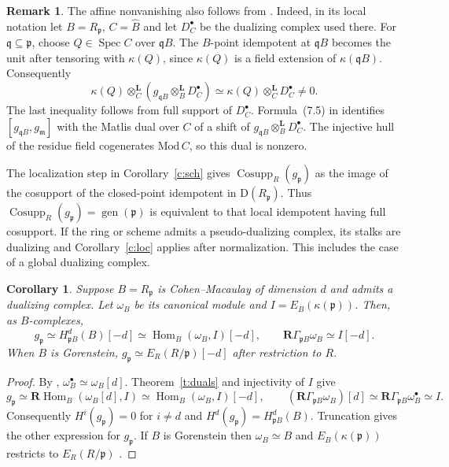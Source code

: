 \documentclass[11pt,reqno]{amsart}
\newtheorem{corollary}[theorem]{Corollary}
\theoremstyle{definition}
\newtheorem{remark}[theorem]{Remark}
\DeclareMathOperator{\Cosupp}{Cosupp}
\DeclareMathOperator{\gen}{gen}
\DeclareMathOperator{\Spec}{Spec}
\DeclareMathOperator{\Hom}{Hom}
\newcommand{\D}{\mathrm D}
\newcommand{\p}{\mathfrak p}
\newcommand{\q}{\mathfrak q}
\newcommand{\m}{\mathfrak m}
\newcommand{\RHom}{\mathbf R\!\operatorname{Hom}}
\newcommand{\RG}{\mathbf R\Gamma}
\newcommand{\dt}{\otimes^{\mathbf L}}
\newcommand{\kpp}{\kappa(\p)}
\numberwithin{equation}{section}
\begin{document}
\begin{remark}
The affine nonvanishing also follows from \cite[Proposition~6.9, equation~(7.5)]{hns}. Indeed, in its local notation let $B=R_{\p}$, $C=\widehat B$ and let $D_C^\bullet$ be the dualizing complex used there. For $\q\subseteq\p$, choose $Q\in\Spec C$ over $\q B$. The $B$-point idempotent at $\q B$ becomes the unit after tensoring with $\kappa(Q)$, since $\kappa(Q)$ is a field extension of $\kappa(\q B)$. Consequently
\[
 \kappa(Q)\dt_C(g_{\q B}\dt_B D_C^\bullet)
 \simeq\kappa(Q)\dt_C D_C^\bullet\ne0 .
\]
The last inequality follows from full support of $D_C^\bullet$. Formula~(7.5) in \cite{hns} identifies $[g_{\q B},g_{\m}]$ with the Matlis dual over $C$ of a shift of $g_{\q B}\dt_B D_C^\bullet$. The injective hull of the residue field cogenerates $\mathrm{Mod}\,C$, so this dual is nonzero.

The localization step in Corollary~\ref{c:sch} gives $\Cosupp_R(g_{\p})$ as the image of the cosupport of the closed-point idempotent in $\D(R_{\p})$. Thus $\Cosupp_R(g_{\p})=\gen(\p)$ is equivalent to that local idempotent having full cosupport. If the ring or scheme admits a pseudo-dualizing complex, its stalks are dualizing and Corollary~\ref{c:loc} applies after normalization. This includes the case of a global dualizing complex.
\end{remark}

\begin{corollary}\label{c:cm}
Suppose $B=R_{\p}$ is Cohen--Macaulay of dimension $d$ and admits a dualizing complex. Let $\omega_B$ be its canonical module and $I=E_B(\kpp)$. Then, as $B$-complexes,
\[
 g_{\p}\simeq H^d_{\p B}(B)[-d]\simeq\Hom_B(\omega_B,I)[-d],
 \qquad \RG_{\p B}\omega_B\simeq I[-d].
\]
When $B$ is Gorenstein, $g_{\p}\simeq E_R(R/\p)[-d]$ after restriction to $R$.
\end{corollary}
\begin{proof}
By \cite[Tag 0AWS]{stacks}, $\omega_B^\bullet\simeq\omega_B[d]$. Theorem~\ref{t:duals} and injectivity of $I$ give
\[
 g_{\p}\simeq\RHom_B(\omega_B[d],I)
 \simeq\Hom_B(\omega_B,I)[-d],\qquad
 (\RG_{\p B}\omega_B)[d]\simeq\RG_{\p B}\omega_B^\bullet\simeq I .
\]
Consequently $H^i(g_{\p})=0$ for $i\ne d$ and $H^d(g_{\p})=H^d_{\p B}(B)$. Truncation gives the other expression for $g_{\p}$. If $B$ is Gorenstein then $\omega_B\simeq B$ and $E_B(\kpp)$ restricts to $E_R(R/\p)$ \cite[Tag 08Y8]{stacks}.
\end{proof}
\end{document}
